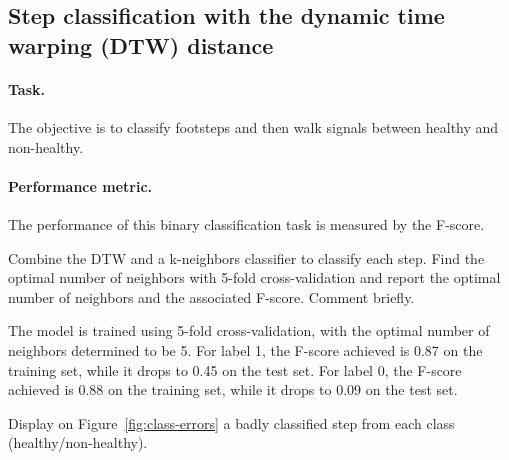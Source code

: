 \documentclass[11pt]{article}
\begin{document}
\subsection{Step classification with the dynamic time warping (DTW) distance}

\paragraph{Task.} The objective is to classify footsteps and then walk signals between healthy and non-healthy.

\paragraph{Performance metric.} The performance of this binary classification task is measured by the F-score.


\begin{exercise}
Combine the DTW and a k-neighbors classifier to classify each step. Find the optimal number of neighbors with 5-fold cross-validation and report the optimal number of neighbors and the associated F-score. Comment briefly.
\end{exercise}

\begin{solution}

The model is trained using 5-fold cross-validation, with the optimal number of neighbors determined to be 5.
For label 1, the F-score achieved is 0.87 on the training set, while it drops to 0.45 on the test set.
For label 0, the F-score achieved is 0.88 on the training set, while it drops to 0.09 on the test set.


\end{solution}

\newpage
\begin{exercise}\label{q:class-errors}
Display on Figure~\ref{fig:class-errors} a badly classified step from each class (healthy/non-healthy).
\end{exercise}
\end{document}
